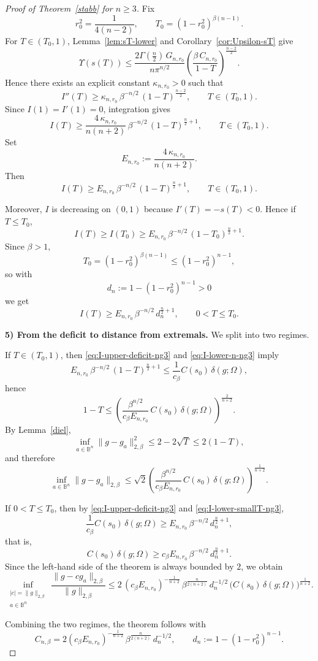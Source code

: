 \begin{proof}[Proof of Theorem~\ref{stabb} for $n\ge 3$]
Fix
\[
r_0^2=\frac1{4(n-2)},\qquad T_0=(1-r_0^2)^{\beta(n-1)}.
\]
For $T\in(T_0,1)$, Lemma~\ref{lem:sT-lower} and Corollary~\ref{cor:Upsilon-sT} give
\[
\Upsilon(s(T))\le
\frac{2\Gamma(\frac n2)\,G_{n,r_0}}{n\pi^{n/2}}
\left(\frac{\beta\,C_{n,r_0}}{1-T}\right)^{\frac{n-2}{2}}.
\]
Hence there exists an explicit constant $\kappa_{n,r_0}>0$ such that
\[
I''(T)\ge \kappa_{n,r_0}\,\beta^{-n/2}\,(1-T)^{\frac{n-2}{2}},
\qquad T\in(T_0,1).
\]
Since $I(1)=I'(1)=0$, integration gives
\[
I(T)\ge
\frac{4\,\kappa_{n,r_0}}{n(n+2)}\,\beta^{-n/2}\,(1-T)^{\frac n2+1},
\qquad T\in(T_0,1).
\]
Set
\[
E_{n,r_0}:=\frac{4\,\kappa_{n,r_0}}{n(n+2)}.
\]
Then
\begin{equation}\label{eq:I-lower-n-ng3}
I(T)\ge E_{n,r_0}\,\beta^{-n/2}\,(1-T)^{\frac n2+1},
\qquad T\in(T_0,1).
\end{equation}

Moreover, $I$ is decreasing on $(0,1)$ because $I'(T)=-s(T)<0$. Hence if $T\le T_0$,
\[
I(T)\ge I(T_0)\ge E_{n,r_0}\,\beta^{-n/2}\,(1-T_0)^{\frac n2+1}.
\]
Since $\beta>1$,
\[
T_0=(1-r_0^2)^{\beta(n-1)}\le (1-r_0^2)^{n-1},
\]
so with
\[
d_n:=1-(1-r_0^2)^{n-1}>0
\]
we get
\begin{equation}\label{eq:I-lower-smallT-ng3}
I(T)\ge E_{n,r_0}\,\beta^{-n/2}\,d_n^{\frac n2+1},
\qquad 0<T\le T_0.
\end{equation}

\smallskip\noindent
\textbf{5) From the deficit to distance from extremals.}
We split into two regimes.

If $T\in(T_0,1)$, then \eqref{eq:I-upper-deficit-ng3} and \eqref{eq:I-lower-n-ng3} imply
\[
E_{n,r_0}\,\beta^{-n/2}\,(1-T)^{\frac n2+1}
\le
\frac1{c_\beta}C(s_0)\,\delta(g;\Omega),
\]
hence
\[
1-T
\le
\left(
\frac{\beta^{n/2}}{c_\beta E_{n,r_0}}\,
C(s_0)\,\delta(g;\Omega)
\right)^{\frac{2}{n+2}}.
\]
By Lemma~\ref{diel},
\[
\inf_{a\in\mathbb B^n}\|g-g_a\|_{2,\beta}^2\le 2-2\sqrt{T}\le 2(1-T),
\]
and therefore
\[
\inf_{a\in\mathbb B^n}\|g-g_a\|_{2,\beta}
\le
\sqrt2
\left(
\frac{\beta^{n/2}}{c_\beta E_{n,r_0}}\,
C(s_0)\,\delta(g;\Omega)
\right)^{\frac1{n+2}}.
\]

If $0<T\le T_0$, then by \eqref{eq:I-upper-deficit-ng3} and \eqref{eq:I-lower-smallT-ng3},
\[
\frac1{c_\beta}C(s_0)\,\delta(g;\Omega)
\ge
E_{n,r_0}\,\beta^{-n/2}\,d_n^{\frac n2+1},
\]
that is,
\[
C(s_0)\,\delta(g;\Omega)
\ge
c_\beta E_{n,r_0}\,\beta^{-n/2}\,d_n^{\frac n2+1}.
\]
Since the left-hand side of the theorem is always bounded by $2$, we obtain
\[
\inf_{\substack{|c|=\|g\|_{2,\beta}\\ a\in\mathbb B^n}}
\frac{\|g-cg_a\|_{2,\beta}}{\|g\|_{2,\beta}}
\le
2\,(c_\beta E_{n,r_0})^{-\frac1{n+2}}\,
\beta^{\frac{n}{2(n+2)}}\,d_n^{-1/2}\,
\bigl(C(s_0)\,\delta(g;\Omega)\bigr)^{\frac1{n+2}}.
\]

Combining the two regimes, the theorem follows with
\[
C_{n,\beta}
=
2(c_\beta E_{n,r_0})^{-\frac1{n+2}}\,
\beta^{\frac{n}{2(n+2)}}
\,d_n^{-1/2},
\qquad
d_n:=1-(1-r_0^2)^{n-1}.
\]
\end{proof}

